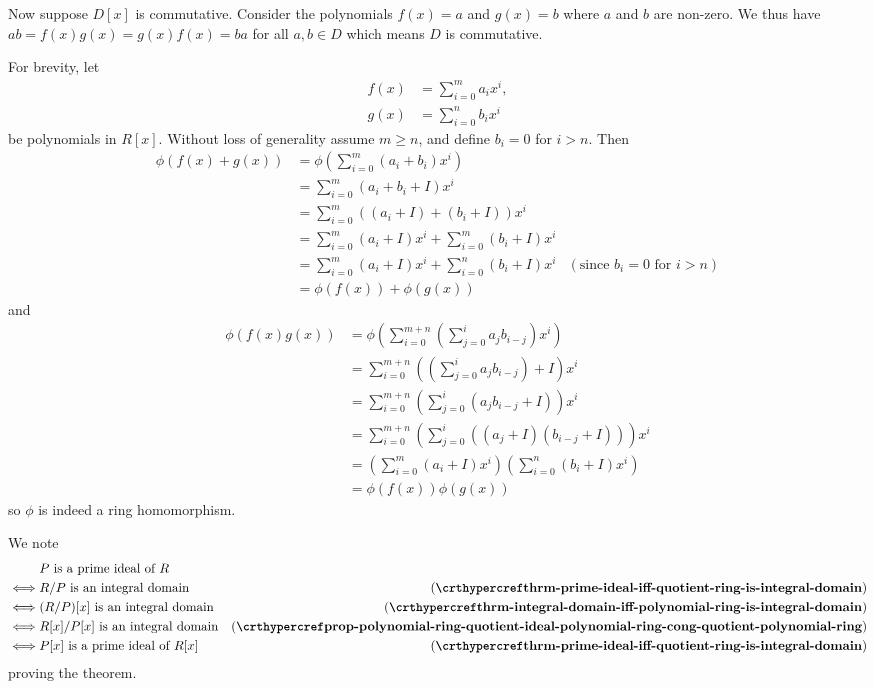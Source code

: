 \begin{questions}
\begin{partquestions}{\alph*}
        Now suppose $D[x]$ is commutative. Consider the polynomials $f(x) = a$ and $g(x) = b$ where $a$ and $b$ are non-zero. We thus have $ab = f(x)g(x) = g(x)f(x) = ba$ for all $a,b \in D$ which means $D$ is commutative.
    \end{partquestions}

    \item For brevity, let
    \begin{align*}
        f(x) &= \sum_{i=0}^ma_ix^i,\\
        g(x) &= \sum_{i=0}^nb_ix^i
    \end{align*}
    be polynomials in $R[x]$. Without loss of generality assume $m \geq n$, and define $b_i = 0$ for $i > n$. Then
    \begin{align*}
        \phi(f(x) + g(x)) &= \phi\left(\sum_{i=0}^m (a_i+b_i)x^i\right)\\
        &= \sum_{i=0}^m (a_i+b_i + I)x^i\\
        &= \sum_{i=0}^m ((a_i + I) + (b_i + I))x^i\\
        &= \sum_{i=0}^m (a_i + I)x^i + \sum_{i=0}^m (b_i + I)x^i\\
        &= \sum_{i=0}^m (a_i + I)x^i + \sum_{i=0}^n (b_i + I)x^i & (\text{since } b_i = 0\text{ for } i > n)\\
        &= \phi(f(x)) + \phi(g(x))
    \end{align*}
    and
    \begin{align*}
        \phi(f(x)g(x)) &= \phi\left(\sum_{i=0}^{m+n}\left(\sum_{j=0}^i a_jb_{i-j}\right)x^i\right)\\
        &= \sum_{i=0}^{m+n}\left(\left(\sum_{j=0}^i a_jb_{i-j}\right) + I\right)x^i\\
        &= \sum_{i=0}^{m+n}\left(\sum_{j=0}^i (a_jb_{i-j} + I)\right)x^i\\
        &= \sum_{i=0}^{m+n}\left(\sum_{j=0}^i ((a_j+I)(b_{i-j}+I))\right)x^i\\
        &= \left(\sum_{i=0}^m(a_i+I)x^i\right)\left(\sum_{i=0}^n(b_i+I)x^i\right)\\
        &= \phi(f(x))\phi(g(x))
    \end{align*}
    so $\phi$ is indeed a ring homomorphism.

    \item We note
    \begin{align*}
        &P \text{ is a prime ideal of }R\\
        \iff&R/P \text{ is an integral domain} & (\myref{thrm-prime-ideal-iff-quotient-ring-is-integral-domain})\\
        \iff&(R/P)[x] \text{ is an integral domain} & (\myref{thrm-integral-domain-iff-polynomial-ring-is-integral-domain})\\
        \iff&R[x]/P[x] \text{ is an integral domain} & (\myref{prop-polynomial-ring-quotient-ideal-polynomial-ring-cong-quotient-polynomial-ring})\\
        \iff&P[x]\text{ is a prime ideal of }R[x] & (\myref{thrm-prime-ideal-iff-quotient-ring-is-integral-domain})
    \end{align*}
    proving the theorem.


\end{questions}
